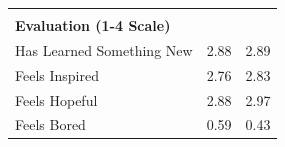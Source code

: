 \documentclass[hideothersubsections, usenames,dvipsnames,10pt]{beamer}
\begin{document}
\begin{frame}
{{\begin{table}[htbp]
\begin{tabular}{lcc}
          																				&       &        \\
    \multicolumn{1}{l}{\textbf{Evaluation (1-4 Scale)}} 								&       &         \\
    \multicolumn{1}{l}{Has Learned Something New} 										& 2.88  & 2.89   \\
    \multicolumn{1}{l}{Feels Inspired} 													& 2.76  & 2.83   \\
    \multicolumn{1}{l}{Feels Hopeful} 													& 2.88  & 2.97  \\
    \multicolumn{1}{l}{Feels Bored} 													& 0.59  & 0.43   \\
    \end{tabular}

\end{table}}}
\end{frame}
\end{document}
